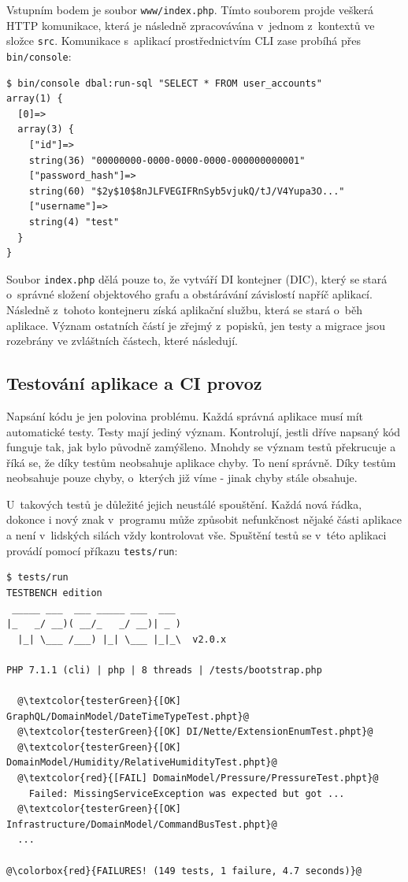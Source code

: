 Vstupním bodem je soubor \texttt{www/index.php}. Tímto souborem projde ve\-ške\-rá HTTP komunikace, která je následně zpracovávána v~jednom z~kontextů ve složce \texttt{src}. Komunikace s~aplikací prostřednictvím CLI zase probíhá přes \texttt{bin/console}:

\begin{verbatim}
$ bin/console dbal:run-sql "SELECT * FROM user_accounts"
array(1) {
  [0]=>
  array(3) {
    ["id"]=>
    string(36) "00000000-0000-0000-0000-000000000001"
    ["password_hash"]=>
    string(60) "$2y$10$8nJLFVEGIFRnSyb5vjukQ/tJ/V4Yupa3O..."
    ["username"]=>
    string(4) "test"
  }
}
\end{verbatim}

Soubor \texttt{index.php} dělá pouze to, že vytváří DI kontejner (DIC), který se stará o~správné složení objektového grafu a obstárávání závislostí napříč aplikací. Následně z~tohoto kontejneru získá aplikační službu, která se stará o~běh aplikace. Význam ostatních částí je zřejmý z~popisků, jen testy a migrace jsou rozebrány ve zvláštních částech, které následují.

\subsection{Testování aplikace a CI provoz}
Napsání kódu je jen polovina problému. Každá správná aplikace musí mít automatické testy. Testy mají jediný význam. Kontrolují, jestli dříve napsaný kód funguje tak, jak bylo původně zamýšleno. Mnohdy se význam testů překrucuje a říká se, že díky testům neobsahuje aplikace chyby. To není správně. Díky testům neobsahuje pouze chyby, o~kterých již víme - jinak chyby stále obsahuje.

U~takových testů je důležité jejich neustálé spouštění. Každá nová řádka, dokonce i nový znak v~programu může způsobit nefunkčnost nějaké části aplikace a není v~lidských silách vždy kontrolovat vše. Spuštění testů se v~této aplikaci provádí pomocí příkazu \texttt{tests/run}:

\begin{verbatim}
$ tests/run
TESTBENCH edition
 _____ ___  ___ _____ ___  ___
|_   _/ __)( __/_   _/ __)| _ )
  |_| \___ /___) |_| \___ |_|_\  v2.0.x

PHP 7.1.1 (cli) | php | 8 threads | /tests/bootstrap.php

  @\textcolor{testerGreen}{[OK] GraphQL/DomainModel/DateTimeTypeTest.phpt}@
  @\textcolor{testerGreen}{[OK] DI/Nette/ExtensionEnumTest.phpt}@
  @\textcolor{testerGreen}{[OK] DomainModel/Humidity/RelativeHumidityTest.phpt}@
  @\textcolor{red}{[FAIL] DomainModel/Pressure/PressureTest.phpt}@
    Failed: MissingServiceException was expected but got ...
  @\textcolor{testerGreen}{[OK] Infrastructure/DomainModel/CommandBusTest.phpt}@
  ...

@\colorbox{red}{FAILURES! (149 tests, 1 failure, 4.7 seconds)}@
\end{verbatim}

